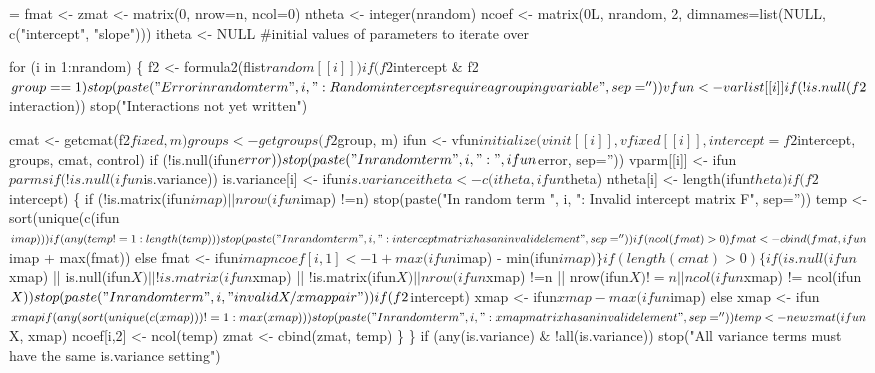 \documentclass{article}
\begin{document}
\begin{nwchunk}
=
 fmat <- zmat <- matrix(0, nrow=n, ncol=0)
 ntheta <- integer(nrandom)
 ncoef  <- matrix(0L, nrandom, 2, dimnames=list(NULL, c("intercept", "slope")))
 itheta <-  NULL   #initial values of parameters to iterate over
 
 for (i in 1:nrandom) \{
     f2 <- formula2(flist$random[[i]])
     if (f2$intercept & f2$group==1)
         stop(paste("Error in random term ", i, 
                    ": Random intercepts require a grouping variable", sep=''))
     vfun <- varlist[[i]]
     if (!is.null(f2$interaction)) stop("Interactions not yet written")
 
     cmat <- getcmat(f2$fixed, m)
     groups <- getgroups(f2$group, m)
     ifun <- vfun$initialize(vinit[[i]], vfixed[[i]], intercept=f2$intercept, 
                         groups, cmat, control)
     if (!is.null(ifun$error)) 
         stop(paste("In random term ", i, ": ", ifun$error, sep=''))
     vparm[[i]] <- ifun$parms
     if (!is.null(ifun$is.variance)) is.variance[i] <- ifun$is.variance
     itheta <- c(itheta, ifun$theta)
     ntheta[i] <- length(ifun$theta)
 
     if (f2$intercept) \{
         if (!is.matrix(ifun$imap) || nrow(ifun$imap) !=n) 
             stop(paste("In random term ", i, 
                        ": Invalid intercept matrix F", sep=''))
         temp <- sort(unique(c(ifun$imap)))
         if (any(temp != 1:length(temp)))
             stop(paste("In random term ", i,
                        ": intercept matrix has an invalid element", sep=''))
 
         if (ncol(fmat) >0) fmat <- cbind(fmat, ifun$imap + max(fmat))
         else fmat <- ifun$imap
         ncoef[i,1] <- 1+ max(ifun$imap) - min(ifun$imap)
         \}
 
     if (length(cmat)>0) \{
         if (is.null(ifun$xmap) || is.null(ifun$X) ||
             !is.matrix(ifun$xmap) || !is.matrix(ifun$X) ||
             nrow(ifun$xmap) !=n || nrow(ifun$X) != n ||
             ncol(ifun$xmap) != ncol(ifun$X))
             stop(paste("In random term ", i,
                        "invalid X/xmap pair"))
         if (f2$intercept) xmap <- ifun$xmap - max(ifun$imap)
         else xmap <- ifun$xmap
         if (any(sort(unique(c(xmap))) != 1:max(xmap)))
              stop(paste("In random term ", i,
                        ": xmap matrix has an invalid element", sep=''))
         
         temp <- newzmat(ifun$X, xmap)
         ncoef[i,2] <- ncol(temp)
         zmat <- cbind(zmat, temp)
         \}
 \}
 if (any(is.variance) & !all(is.variance))
          stop("All variance terms must have the same is.variance setting") 
\end{nwchunk}
\end{document}
